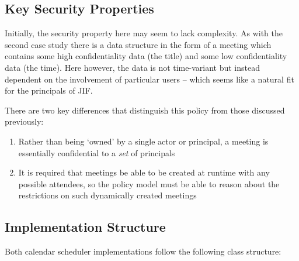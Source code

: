 \subsection{Key Security Properties}

Initially, the security property here may seem to lack complexity. As with the second case study there is a data structure in the form of a meeting which contains some high confidentiality data (the title) and some low confidentiality data (the time). Here however, the data is not time-variant but instead dependent on the involvement of particular users -- which seems like a natural fit for the principals of JIF.

There are two key differences that distinguish this policy from those discussed previously:

\begin{enumerate}
	
	\item Rather than being `owned' by a single actor or principal, a meeting is essentially confidential to a \textit{set} of principals
	
	\item It is required that meetings be able to be created at runtime with any possible attendees, so the policy model must be able to reason about the restrictions on such dynamically created meetings
	
\end{enumerate}

\subsection{Implementation Structure}

Both calendar scheduler implementations follow the following class structure:

